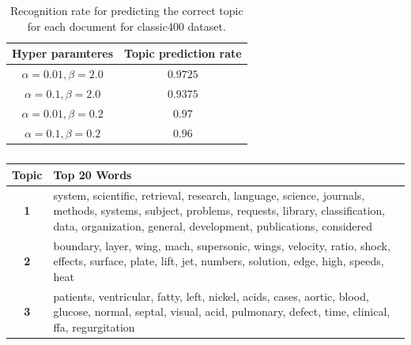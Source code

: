 \documentclass[twoside,12pt]{article}
\begin{document}
\begin{table}[!]
\begin{center}
\begin{tabular}{| c | c |} 
\hline
\textbf{Hyper paramteres}& \textbf{Topic prediction rate}  \\ \hline

$\alpha=0.01,\beta=2.0$ & $0.9725$ \\ \hline
$\alpha=0.1,\beta=2.0$ &  $0.9375$ \\ \hline
$\alpha=0.01,\beta=0.2$ & $0.97$ \\ \hline
$\alpha=0.1,\beta=0.2$ & $0.96$ \\ \hline
 
\end{tabular}
\caption{Recognition rate for predicting the correct topic for each document for classic400 dataset.}
\label{tableClssicRecognition}
\end{center}
\end{table}

\begin{table}[!]
\begin{center}
\begin{tabular}{| c | p{12cm} |}
\hline
\textbf{Topic}& \textbf{Top 20 Words}  \\ \hline
\textbf{1}&system, scientific, retrieval, research, language, science, journals,  methods, systems, subject, problems, requests, library, classification, data,  organization, general, development, publications, considered\\ \hline
\textbf{2}&boundary, layer, wing, mach, supersonic, wings, velocity, ratio, shock, effects, surface, plate, lift, jet, numbers, solution, edge, high, speeds, heat\\
 \hline
\textbf{3}&patients, ventricular, fatty, left, nickel, acids, cases, aortic, blood, glucose, normal, septal, visual, acid, pulmonary, defect, time, clinical, ffa, regurgitation\\
 \hline
 
\end{tabular}
\caption{}
\label{tableTopWordsClassic}
\end{center}
\end{table}
\end{document}
